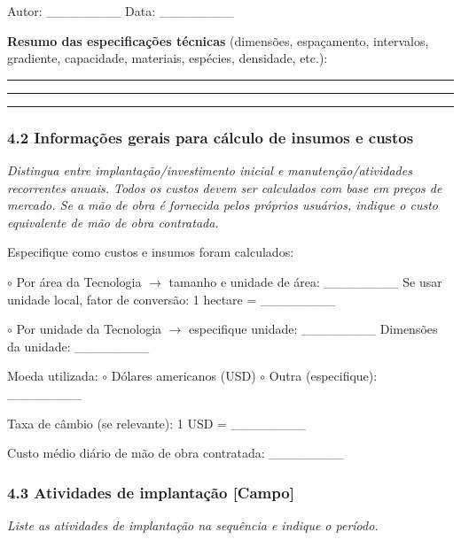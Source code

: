 Autor: \_\_\_\_\_\_\_\_ Data: \_\_\_\_\_\_\_\_

\textbf{Resumo das especificações técnicas} (dimensões, espaçamento, intervalos, gradiente, capacidade, materiais, espécies, densidade, etc.):

\begin{center}\rule{0.5\linewidth}{0.5pt}\end{center}

\begin{center}\rule{0.5\linewidth}{0.5pt}\end{center}

\begin{center}\rule{0.5\linewidth}{0.5pt}\end{center}

\subsubsection{4.2 Informações gerais para cálculo de insumos e custos}\label{informauxe7uxf5es-gerais-para-cuxe1lculo-de-insumos-e-custos}

\emph{Distingua entre implantação/investimento inicial e manutenção/atividades recorrentes anuais. Todos os custos devem ser calculados com base em preços de mercado. Se a mão de obra é fornecida pelos próprios usuários, indique o custo equivalente de mão de obra contratada.}

Especifique como custos e insumos foram calculados:

$\circ$ Por área da Tecnologia $\rightarrow$ tamanho e unidade de área: \_\_\_\_\_\_\_\_ Se usar unidade local, fator de conversão: 1 hectare = \_\_\_\_\_\_\_\_

$\circ$ Por unidade da Tecnologia $\rightarrow$ especifique unidade: \_\_\_\_\_\_\_\_ Dimensões da unidade: \_\_\_\_\_\_\_\_

Moeda utilizada: $\circ$ Dólares americanos (USD) $\circ$ Outra (especifique): \_\_\_\_\_\_\_\_

Taxa de câmbio (se relevante): 1 USD = \_\_\_\_\_\_\_\_

Custo médio diário de mão de obra contratada: \_\_\_\_\_\_\_\_

\subsubsection{4.3 Atividades de implantação {[Campo]}}\label{atividades-de-implantauxe7uxe3o}

\emph{Liste as atividades de implantação na sequência e indique o período.}

